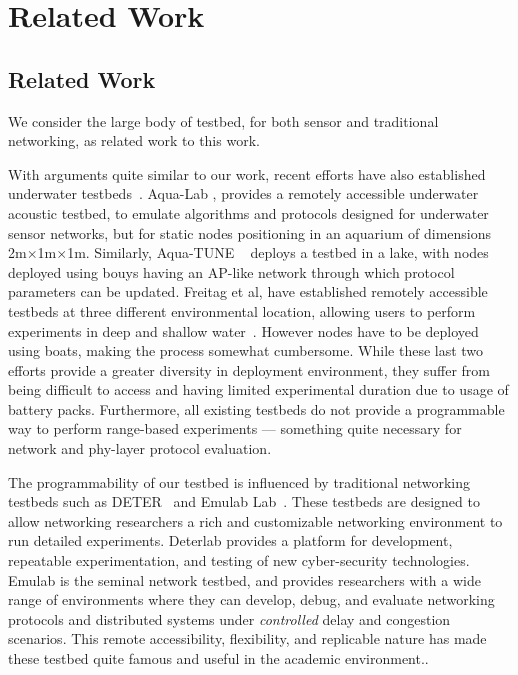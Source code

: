 
\chapter{Related Work} %

\label{Chapter2} %



\section{Related Work}

We consider the large body of testbed,
    for both sensor and traditional networking,
    as related work to this work.

With arguments quite similar to our work,
    recent efforts have also established underwater testbeds~\citep{Peng,aqua-tune,Freitag}.
Aqua-Lab \citep{Peng},
	provides a remotely accessible underwater acoustic testbed,
	to emulate algorithms and protocols designed for underwater
	sensor networks, but for static nodes positioning in an aquarium
	of dimensions 2m$\times$1m$\times$1m.
Similarly,
	Aqua-TUNE ~\citep{aqua-tune} deploys a
	testbed in a lake,
    with nodes deployed using bouys having an AP-like network
    through which protocol parameters can be updated.
Freitag et al, have established
	remotely accessible testbeds at three different environmental location,
    allowing users to perform experiments	
	in deep and shallow water~\citep{Freitag}.
However nodes have to be
    deployed using boats, making
    the process somewhat cumbersome.
While these last two efforts provide a greater
    diversity in deployment environment,
    they suffer from being difficult to access
    and having limited experimental
    duration due to usage of battery packs.
Furthermore, all existing testbeds do not provide
    a programmable way to perform range-based
    experiments --- something quite necessary for
    network and phy-layer protocol evaluation.


The programmability of our testbed is
    influenced by traditional networking testbeds such
     as DETER~\citep{Deter}
 	and Emulab Lab~\citep{Emulab}.
These testbeds are designed to allow networking researchers
    a rich and customizable  networking environment
    to run detailed experiments.
Deterlab provides a platform for
	development, repeatable experimentation, and testing of
	new cyber-security technologies.
Emulab is the seminal
 	network testbed, and provides researchers with a wide
	range of environments where they can develop, debug,
 	and evaluate networking protocols
 and distributed systems under \emph{controlled} delay
 and congestion scenarios.
This remote accessibility,
    flexibility, and replicable nature
    has made these testbed quite famous and useful
    in the academic environment..
